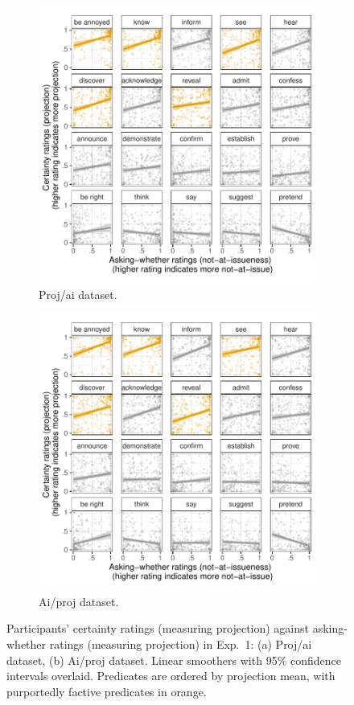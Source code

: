 \documentclass[11pt,fleqn]{article}
\newcommand{\6}{\mbox{$[\hspace*{-.6mm}[$}}
\newcommand{\9}{\mbox{$]\hspace*{-.6mm}]$}}
\begin{document}
\begin{figure}[h!]
\centering
\begin{subfigure}[t]{0.49\textwidth}
\centering
\includegraphics[width=.9\textwidth]{../../results/exp1/graphs/SUP-projai-projection-by-ai}
\caption{Proj/ai dataset.}
\end{subfigure} \hfill \begin{subfigure}[t]{0.49\textwidth}
\centering
\includegraphics[width=.9\textwidth]{../../results/exp1/graphs/SUP-aiproj-projection-by-ai}
\caption{Ai/proj dataset.}
 \end{subfigure}
 
  
\caption{Participants' certainty ratings (measuring projection) against asking-whether ratings (measuring projection) in Exp.~1: (a) Proj/ai dataset, (b) Ai/proj dataset. Linear smoothers with 95\% confidence intervals overlaid. Predicates are ordered by projection mean, with purportedly factive predicates in orange.}
\end{figure}
\end{document}
